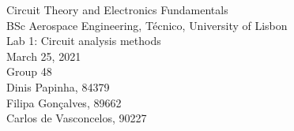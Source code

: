 
\thispagestyle {empty}


\begin{center}
%
\vspace{1.0cm}

\vspace{1cm}
{\FontLb Circuit Theory and Electronics Fundamentals} \\ %
\vspace{1cm}
{\FontSn BSc Aerospace Engineering, Técnico, University of Lisbon} \\ %
\vspace{1cm}
{\FontSn Lab 1: Circuit analysis methods} \\
\vspace{1cm}
{\FontSn March 25, 2021} \\ %
\vspace{1cm}
{\FontSn Group 48} \\ %
{\FontSn Dinis Papinha, 84379} \\ %
{\FontSn Filipa Gonçalves, 89662} \\ %
{\FontSn Carlos de Vasconcelos, 90227} \\ %
%
\end{center}

